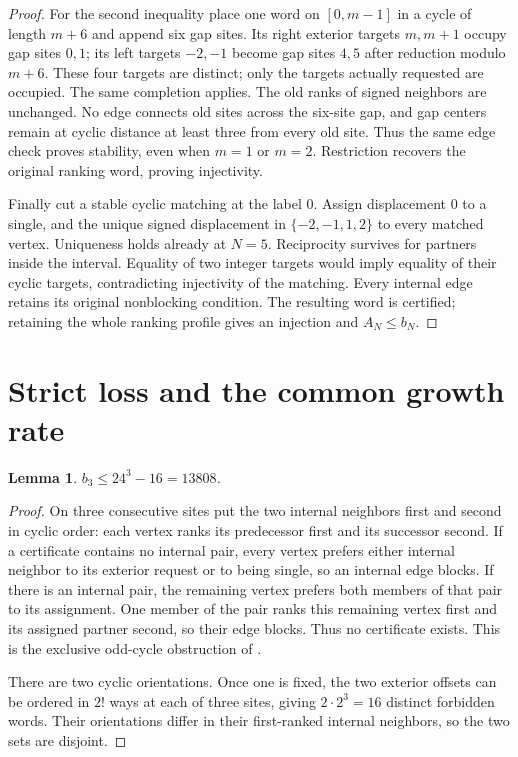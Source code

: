 \documentclass[11pt]{article}
\newtheorem{lemma}[theorem]{Lemma}
\begin{document}
\begin{proof}
For the second inequality place one word on $[0,m-1]$ in a cycle of
length $m+6$ and append six gap sites. Its right exterior targets
$m,m+1$ occupy gap sites $0,1$; its left targets $-2,-1$ become gap
sites $4,5$ after reduction modulo $m+6$. These four targets are
distinct; only the targets actually requested are occupied. The same
completion applies. The old ranks of signed neighbors are unchanged.
No edge connects old sites across the six-site gap, and gap centers
remain at cyclic distance at least three from every old site. Thus the
same edge check proves stability, even when $m=1$ or $m=2$.
Restriction recovers the original ranking word, proving injectivity.

Finally cut a stable cyclic matching at the label $0$. Assign displacement
$0$ to a single, and the unique signed displacement in $\{-2,-1,1,2\}$
to every matched vertex. Uniqueness holds already at $N=5$.
Reciprocity survives for partners inside the interval. Equality of two
integer targets would imply equality of their cyclic targets, contradicting
injectivity of the matching. Every internal edge retains its original
nonblocking condition. The resulting word is certified; retaining the
whole ranking profile gives an injection and $A_N\leq b_N$.
\end{proof}

\section{Strict loss and the common growth rate}
\begin{lemma}\label{lem:triangle}
$b_3\leq24^3-16=13808$.
\end{lemma}
\begin{proof}
On three consecutive sites put the two internal neighbors first and
second in cyclic order: each vertex ranks its predecessor first and its
successor second. If a certificate contains no internal pair, every
vertex prefers either internal neighbor to its exterior request or to
being single, so an internal edge blocks. If there is an internal pair,
the remaining vertex prefers both members of that pair to its assignment.
One member of the pair ranks this remaining vertex first and its
assigned partner second, so their edge blocks. Thus no certificate exists.
This is the exclusive odd-cycle obstruction of
\cite[Section~2 and equation~(14)]{mertens2005}.

There are two cyclic orientations. Once one is fixed, the two exterior
offsets can be ordered in $2!$ ways at each of three sites, giving
$2\cdot2^3=16$ distinct forbidden words. Their orientations differ in
their first-ranked internal neighbors, so the two sets are disjoint.
\end{proof}
\end{document}
